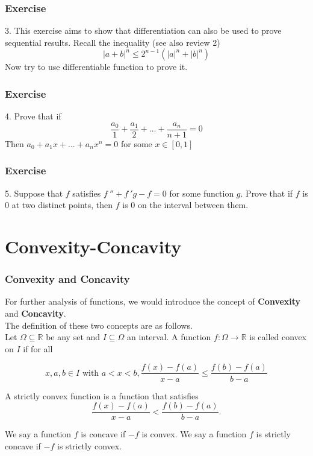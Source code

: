 \documentclass{beamer}
\begin{document}
\begin{frame}
    \frametitle{Exercise}
3. This exercise aims to show that differentiation can also be used to prove sequential results. Recall 
the inequality (see also review 2)
\begin{equation*}
    |a+b|^n\leq 2^{n-1}(|a|^n+|b|^n)
\end{equation*}
Now try to use differentiable function to prove it.
\end{frame}
\begin{frame}
    \frametitle{Exercise}
4. Prove that if 
\begin{equation*}
    \frac{a_0}{1}+\frac{a_1}{2}+\dots+\frac{a_n}{n+1}=0
\end{equation*}
Then $a_0+a_1x+\dots+a_nx^n=0$ for some $x\in[0,1]$
\end{frame}
\begin{frame}
        \frametitle{Exercise}
    5. Suppose that $f$ satisfies $f~''+f~'g-f=0$ for some function $g$. Prove that if $f$ is 0 at two distinct points, 
    then $f$ is 0 on the interval between them.
        
\end{frame}

\section{Convexity-Concavity}
\begin{frame}
    \frametitle{Convexity and Concavity}

For further analysis of functions, we would introduce the concept of \textbf{Convexity} and \textbf{Concavity}. \\
The definition of these two concepts are as follows.\\

\hspace{1em}
Let $\Omega\subseteq\mathbb{R}$ be any set and $I\subseteq\Omega$ an interval. A function $f:\Omega\rightarrow\mathbb{R}$ 
is called convex on $I$ if for all 

\begin{equation*}
    x, a, b\in I \text{ with } a<x<b, \frac{f(x)-f(a)}{x-a}\leq\frac{f(b)-f(a)}{b-a}
\end{equation*}

\vspace{0.5em}
\hspace{1em}
A strictly convex function is a function that satisfies 
\begin{equation}
    \frac{f(x)-f(a)}{x-a}<\frac{f(b)-f(a)}{b-a}.
\end{equation}

\hspace{1em}
We say a function $f$ is concave if $-f$ is convex. We say a function $f$ is strictly concave if $-f$ is strictly convex.





\end{frame}
\end{document}
